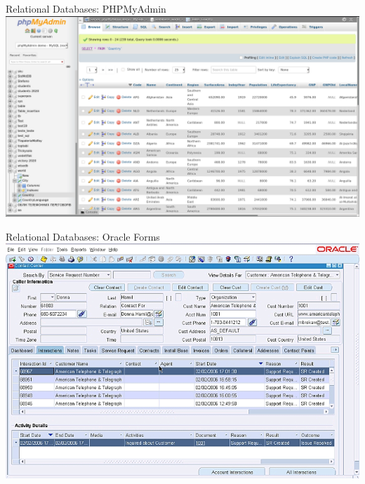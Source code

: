 \documentclass[aspectratio=1610]{beamer}
\begin{document}
\begin{frame}{Relational Databases: PHPMyAdmin}
\centering
\includegraphics[width=0.9\paperwidth]{img/phpmyadmin.png}
\end{frame}

\begin{frame}{Relational Databases: Oracle Forms}
\centering
\includegraphics[width=0.7\paperwidth]{img/oracleforms.png}
\end{frame}

\end{document}
